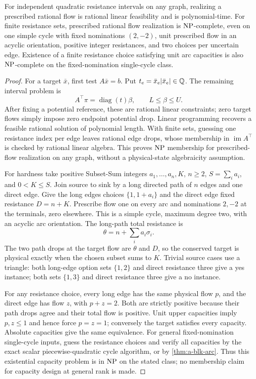 \begin{theorem}
\label{thm:a-bound-realization}
For independent quadratic resistance intervals on any graph, realizing
a prescribed rational flow is rational linear feasibility and is
polynomial-time. For finite resistance sets, prescribed rational flow
realization is $\mathrm{NP}$-complete, even on one simple cycle with fixed
nominations $(2,-2)$, unit prescribed flow in an acyclic orientation,
positive integer resistances, and two choices per uncertain edge.
Existence of a finite resistance choice satisfying unit arc capacities
is also $\mathrm{NP}$-complete on the fixed-nomination single-cycle class.
\end{theorem}
\begin{proof}
For a target $\bar x$, first test $A\bar x=b$. Put
$t_e=\bar x_e|\bar x_e|\in\mathbb{Q}$. The remaining interval problem is
\[
 A^\top\pi=\operatorname{diag}(t)\beta,\qquad L\le\beta\le U.
\]
After fixing a potential reference, these are rational linear
constraints; zero target flows simply impose zero endpoint potential
drop. Linear programming recovers a feasible rational solution of
polynomial length. With finite sets, guessing one
resistance index per edge leaves rational edge drops, whose membership
in $\operatorname{im}A^\top$ is checked by rational linear algebra.
This proves $\mathrm{NP}$ membership for prescribed-flow realization on any
graph, without a physical-state algebraicity assumption.

For hardness take positive Subset-Sum integers $a_1,\ldots,a_n,K$,
$n\ge2$, $S=\sum_i a_i$, and $0<K\le S$. Join source to sink by a
long directed path of $n$ edges and one direct edge. Give the long edges
choices $\{1,1+a_i\}$ and the direct edge fixed resistance $D=n+K$.
Prescribe flow one on every arc and nominations $2,-2$ at the terminals,
zero elsewhere. This is a simple cycle, maximum degree two, with an
acyclic arc orientation. The long-path total resistance is
\[
 \theta=n+\sum_i a_i\sigma_i.
\]
The two path drops at the target flow are $\theta$ and $D$, so the
conserved target is physical exactly when the chosen subset sums to
$K$. Trivial source cases use a triangle: both long-edge option sets
$\{1,2\}$ and direct resistance three give a yes instance; both sets
$\{1,3\}$ and direct resistance three give a no instance.

For any resistance choice, every long edge has the same physical flow
$p$, and the direct edge has flow $z$, with $p+z=2$. Both are strictly
positive because their path drops agree and their total flow is
positive. Unit upper capacities imply $p,z\le1$ and hence force $p=z=1$;
conversely the target satisfies every capacity. Absolute capacities
give the same equivalence. For general fixed-nomination single-cycle
inputs, guess the resistance choices and verify all capacities by the
exact scalar piecewise-quadratic cycle algorithm, or by
\cref{thm:a-blk-arc}. Thus this existential capacity problem is in $\mathrm{NP}$
on the stated class; no membership claim for capacity design at general
rank is made.
\end{proof}

